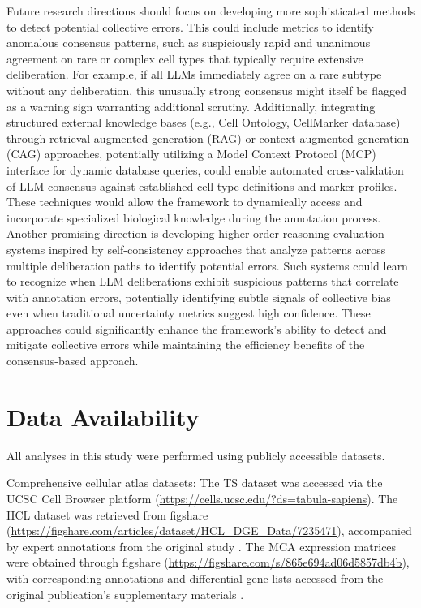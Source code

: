 \documentclass[pdflatex,sn-nature]{sn-jnl}%
\theoremstyle{thmstyleone}%
\theoremstyle{thmstyletwo}%
\theoremstyle{thmstylethree}%
\begin{document}
Future research directions should focus on developing more sophisticated methods to detect potential collective errors. This could include metrics to identify anomalous consensus patterns, such as suspiciously rapid and unanimous agreement on rare or complex cell types that typically require extensive deliberation. For example, if all LLMs immediately agree on a rare subtype without any deliberation, this unusually strong consensus might itself be flagged as a warning sign warranting additional scrutiny. Additionally, integrating structured external knowledge bases (e.g., Cell Ontology, CellMarker database) through retrieval-augmented generation (RAG) or context-augmented generation (CAG) approaches, potentially utilizing a Model Context Protocol (MCP) interface for dynamic database queries, could enable automated cross-validation of LLM consensus against established cell type definitions and marker profiles. These techniques would allow the framework to dynamically access and incorporate specialized biological knowledge during the annotation process. Another promising direction is developing higher-order reasoning evaluation systems inspired by self-consistency approaches \cite{wangSelfConsistencyImprovesChain2023} that analyze patterns across multiple deliberation paths to identify potential errors. Such systems could learn to recognize when LLM deliberations exhibit suspicious patterns that correlate with annotation errors, potentially identifying subtle signals of collective bias even when traditional uncertainty metrics suggest high confidence. These approaches could significantly enhance the framework's ability to detect and mitigate collective errors while maintaining the efficiency benefits of the consensus-based approach.

\section{Data Availability}
All analyses in this study were performed using publicly accessible datasets.

Comprehensive cellular atlas datasets:
The TS dataset was accessed via the UCSC Cell Browser platform (\url{https://cells.ucsc.edu/?ds=tabula-sapiens}).
The HCL dataset was retrieved from figshare (\url{https://figshare.com/articles/dataset/HCL_DGE_Data/7235471}), accompanied by expert annotations from the original study \cite{hanConstructionHumanCell2020}.
The MCA expression matrices were obtained through figshare (\url{https://figshare.com/s/865e694ad06d5857db4b}), with corresponding annotations and differential gene lists accessed from the original publication's supplementary materials \cite{hanMappingMouseCell2018}.
\end{document}
